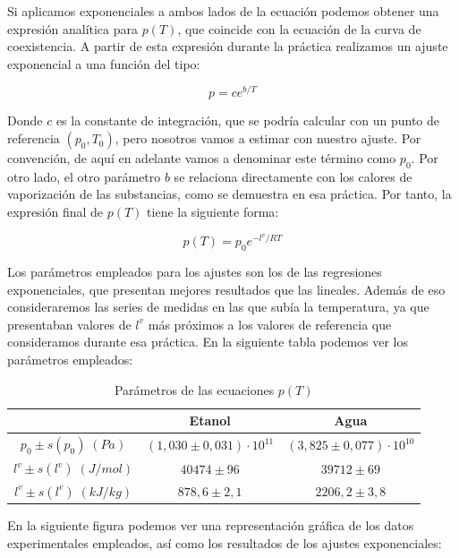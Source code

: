\documentclass[a4paper,12pt,titlepage]{article}
\begin{document}
Si aplicamos exponenciales a ambos lados de la ecuación podemos obtener una expresión analítica para $p(T)$, que coincide con la ecuación de la curva de coexistencia. A partir de esta expresión durante la práctica realizamos un ajuste exponencial a una función del tipo:

\begin{equation}
    p = ce^{b/T}
\end{equation}

Donde $c$ es la constante de integración, que se podría calcular con un punto de referencia $(p_0,T_0)$, pero nosotros vamos a estimar con nuestro ajuste. Por convención, de aquí en adelante vamos a denominar este término como $p_0$. Por otro lado, el otro parámetro $b$ se relaciona directamente con los calores de vaporización de las substancias, como se demuestra en esa práctica. Por tanto, la expresión final de $p(T)$ tiene la siguiente forma:

\begin{equation}
    p(T) = p_0 e^{-l^v/RT}
\end{equation}

Los parámetros empleados para los ajustes son los de las regresiones exponenciales, que presentan mejores resultados que las lineales. Además de eso consideraremos las series de medidas en las que subía la temperatura, ya que presentaban valores de $l^v$ más próximos a los valores de referencia que consideramos durante esa práctica. En la siguiente tabla podemos ver los parámetros empleados:

\begin{table}[h!]
\centering
\begin{tabular}{c|c|c|}
\cline{2-3}
                & Etanol & Agua \\ \hline
\multicolumn{1}{|c|}{$p_0 \pm s(p_0) \;(Pa)$}     & $(1,030 \pm 0,031) \cdot 10^{11}$  & $(3,825 \pm 0,077) \cdot 10^{10}$  \\ \hline
\multicolumn{1}{|c|}{$l^v \pm s(l^v) \; (J/mol)$} & $40474 \pm 96$ & $39712 \pm 69$ \\ \hline
\multicolumn{1}{|c|}{$l^v \pm s(l^v) \; (kJ/kg)$} & $878,6 \pm 2,1$ &  $2206,2 \pm 3,8$    \\ \hline
\end{tabular}
\caption{Parámetros de las ecuaciones $p(T)$}
\label{tab:my-table}
\end{table}

En la siguiente figura podemos ver una representación gráfica de los datos experimentales empleados, así como los resultados de los ajustes exponenciales:
\end{document}
